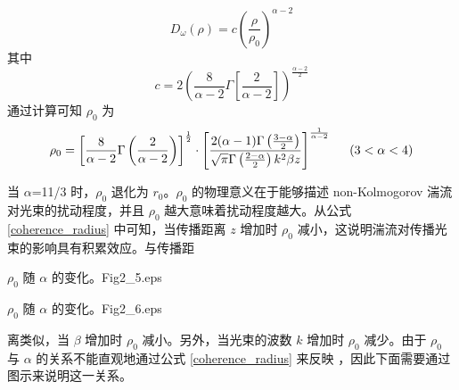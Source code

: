 \documentclass[master]{thesis-uestc}
\begin{document}
\begin{equation}\label{non_wave_function2}
 D_{\omega}(\rho)=c\left(\frac{\rho}{\rho_0}\right)^{\alpha-2}
\end{equation}
\noindent 其中
\begin{equation}\label{non_wave_function}
 c=2\left(\frac{8}{\alpha-2}\Gamma\left[\frac{2}{\alpha-2}\right]\right)^{\frac{\alpha-2}{2}}
\end{equation}
\noindent 通过计算可知 $\rho_0$ 为
\begin{equation}\label{coherence_radius}
  \rho_0=\left[\frac{8}{\alpha-2}\Gamma\left(\frac{2}{\alpha-2}\right)\right]^\frac12
  \cdot\left[\frac{2(\alpha-1)\Gamma\left(\frac{3-\alpha}{2}\right)}{\sqrt{\pi}\Gamma\left(\frac{2-\alpha}{2}\right)k^2\beta{z}}\right]^\frac{1}{\alpha-2}
  \hspace{0.5cm}(3<\alpha<4)
\end{equation}

\noindent 当 $\alpha$=11/3 时，$\rho_0$ 退化为 $r_0$。$\rho_0$ 的物理意义在于能够描述 non-Kolmogorov 湍流对光束的扰动程度，并且 $\rho_0$ 越大意味着扰动程度越大。从公式 \eqref{coherence_radius} 中可知，当传播距离 $z$ 增加时 $\rho_0$ 减小，这说明湍流对传播光束的影响具有积累效应。与传播距 \linebreak[4]

\begin{pics}[H]{ $\rho_0$ 随 $\alpha$ 的变化。}{Fig2_5.eps}
\end{pics}

\begin{pics}[H]{ $\rho_0$ 随  $\alpha$ 的变化。}{Fig2_6.eps}
\end{pics}

\noindent 离类似，当 $\beta$ 增加时 $\rho_0$ 减小。另外，当光束的波数 $k$ 增加时 $\rho_0$ 减少。由于 $\rho_0$ 与 $\alpha$ 的关系不能直观地通过公式 \eqref{coherence_radius} 来反映 ，因此下面需要通过图示来说明这一关系。
\end{document}
